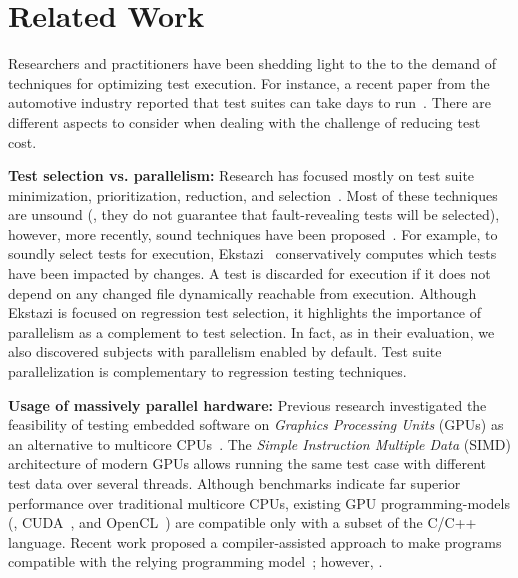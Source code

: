 \section{Related Work}
\label{sec:related}
Researchers and practitioners have been shedding light to the to the
demand of techniques for optimizing test execution. For instance, a
recent paper from the automotive industry reported that test suites
can take days to run~\cite{artl-etal-icst2015}.  There are different
aspects to consider when dealing with the challenge of reducing
test cost. 

\textbf{Test selection vs. parallelism:}
Research has focused mostly on test suite minimization,
prioritization, reduction, and selection~\cite{yoo-harman-stvr2012}.
Most of these techniques are unsound (\ie{}, they do not guarantee
that fault-revealing tests will be selected), however, more recently,
sound techniques have been
proposed~\cite{gligoric-etal-issta2015,soetens-etal-2016}.  For
example, to soundly select tests for execution,
Ekstazi~\cite{ekstazi-web,gligoric-etal-issta2015} conservatively
computes which tests have been impacted by changes.  A test is
discarded for execution if it does not depend on any changed file
dynamically reachable from execution. Although Ekstazi is focused on
regression test selection, it highlights the importance of parallelism
as a complement to test selection.  In fact, as in their evaluation, we
also discovered subjects with parallelism enabled by default.  Test
suite parallelization is complementary to regression testing
techniques.

\textbf{Usage of massively parallel hardware:}
Previous research investigated the feasibility of testing embedded
software on \emph{Graphics Processing Units} (GPUs) as an alternative
to multicore CPUs~\cite{rajan-etal-ase2014}.
The \emph{Simple Instruction Multiple Data} (SIMD) architecture of
modern GPUs allows running the same test case with different test data
over several threads.
Although benchmarks indicate far superior performance over traditional
multicore CPUs, existing GPU programming-models (\eg,
CUDA~\cite{cuda}, and OpenCL~\cite{opencl}) are compatible only with a
subset of the C/C++ language.
Recent work proposed a compiler-assisted approach to make programs
compatible with the relying programming
model~\cite{yaneva-etal-issta2017}; however, .


